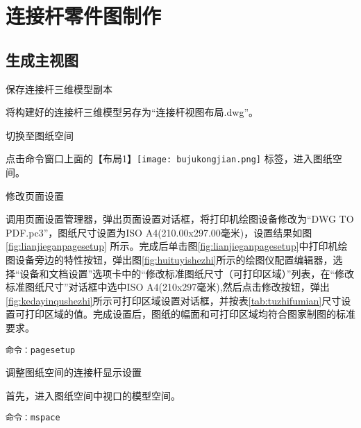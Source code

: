 \section{连接杆零件图制作}\label{sec:lianjieganshitu}
\subsection{生成主视图}
\begin{procedure}
\item 保存连接杆三维模型副本

将构建好的连接杆三维模型另存为“连接杆视图布局.dwg”。

\item 切换至图纸空间

点击命令窗口上面的【布局1】\texttt{[image: bujukongjian.png]} 标签，进入图纸空间。

\item 修改页面设置

调用页面设置管理器，弹出页面设置对话框，将打印机绘图设备修改为“DWG TO PDF.pc3”，图纸尺寸设置为ISO A4(210.00x297.00毫米)，设置结果如图\ref{fig:lianjieganpagesetup} 所示。完成后单击图\ref{fig:lianjieganpagesetup}中打印机绘图设备旁边的特性按钮，弹出图\ref{fig:huituyishezhi}所示的绘图仪配置编辑器，选择“设备和文档设置”选项卡中的“修改标准图纸尺寸（可打印区域）”列表，在“修改标准图纸尺寸”对话框中选中ISO A4(210x297毫米),然后点击修改按钮，弹出\ref{fig:kedayinqushezhi}所示可打印区域设置对话框，并按表\ref{tab:tuzhifumian}尺寸设置可打印区域的值。完成设置后，图纸的幅面和可打印区域均符合图家制图的标准要求。

\begin{figure}[htbp]
\centering
\begin{floatrow}[3]
\end{floatrow}
\end{figure}

\begin{lstlisting}
命令：pagesetup
\end{lstlisting}

\item 调整图纸空间的连接杆显示设置

首先，进入图纸空间中视口的模型空间。
\begin{lstlisting}
命令：mspace
\end{lstlisting}


\end{procedure}
